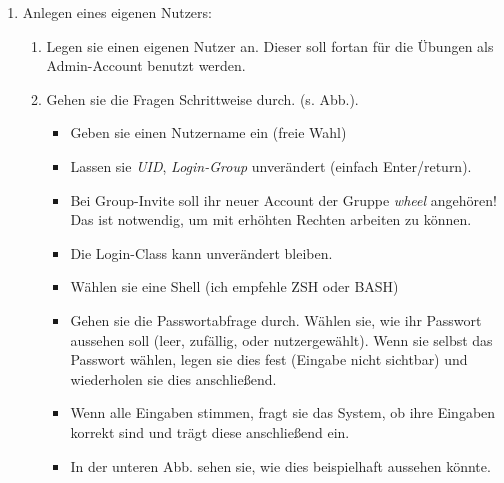 \documentclass[paper=a4,fontsize=11pt]{scrartcl}%
\numberwithin{equation}{section}
\begin{document}
\begin{enumerate}
\begin{enumerate} [label=(\alph*)]
          \textbf{Kommandos:} \textcolor{blue}{\emph{freebsd-version}, \emph{uname}}
          \item Viele Unix-Systeme haben eine Quota -- eine Beschränkung des Speicherverbrauchs, ist diese auf der VM vorhanden? Falls ja, wie sieht diese aus?\\
          \textbf{Kommandos:} \textcolor{blue}{\emph{quota}}
          \item Wie sie der verfügbare Plattenplatz aus?\\
          \textbf{Kommandos:} \textcolor{blue}{\emph{df -h}}
        \end{enumerate}
        \item Anlegen eines eigenen Nutzers:
        \begin{enumerate}
        		\item Legen sie einen eigenen Nutzer an. Dieser soll fortan für die Übungen als Admin-Account benutzt werden.
        		\item Gehen sie die Fragen Schrittweise durch. (s. Abb.).
        		\begin{itemize}
        			\item Geben sie einen Nutzername ein (freie Wahl)
        			\item Lassen sie \emph{UID}, \emph{Login-Group} unverändert (einfach Enter/return).
        			\item Bei Group-Invite soll ihr neuer Account der Gruppe \emph{wheel} angehören! Das ist notwendig, um mit erhöhten Rechten arbeiten zu können.
        			\item Die Login-Class kann unverändert bleiben.
        			\item Wählen sie eine Shell (ich empfehle ZSH oder BASH)
        			\item Gehen sie die Passwortabfrage durch. Wählen sie, wie ihr Passwort aussehen soll (leer, zufällig, oder nutzergewählt). Wenn sie selbst das Passwort wählen, legen sie dies fest (Eingabe nicht sichtbar) und wiederholen sie dies anschließend.
        			\item Wenn alle Eingaben stimmen, fragt sie das System, ob ihre Eingaben korrekt sind und trägt diese anschließend ein.
       			\item In der unteren Abb. sehen sie, wie dies beispielhaft aussehen könnte.
       			\begin{figure}[h]
       			\centering

\end{figure}
\end{itemize}
\end{enumerate}
\end{enumerate}
\end{document}
